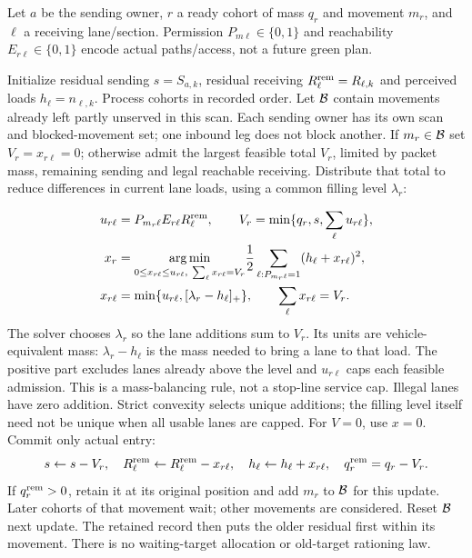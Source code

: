 \documentclass[10pt,a4paper]{article}
\newcommand{\pos}[1]{[#1]_+}
\begin{document}
Let $a$ be the sending owner, $r$ a ready cohort of mass $q_r$ and
movement $m_r$, and $\ell$ a receiving lane/section.
Permission $P_{m\ell}\in\{0,1\}$ and reachability
$E_{r\ell}\in\{0,1\}$ encode actual paths/access, not a future green plan.

Initialize residual sending $s=S_{a,k}$, residual receiving
$R^{\rm rem}_\ell=R_{\ell,k}$ and perceived loads $h_\ell=n_{\ell,k}$.
Process cohorts in recorded order. Let ${\cal B}$ contain movements
already left partly unserved in this scan. Each sending owner has its own
scan and blocked-movement set; one inbound leg does not block another.
If $m_r\in{\cal B}$ set $V_r=x_{r\ell}=0$; otherwise admit the largest
feasible total $V_r$, limited by packet mass, remaining sending and
legal reachable receiving. Distribute that total to reduce differences
in current lane loads, using a common filling level $\lambda_r$:

\begin{align}
 u_{r\ell}&=P_{m_r\ell}E_{r\ell}R^{\rm rem}_\ell,\qquad
 V_r=\min\{q_r,s,\sum_\ell u_{r\ell}\},\nonumber\\
 x_r&=\underset{0\leq x_{r\ell}\leq u_{r\ell},\
                    \sum_\ell x_{r\ell}=V_r}{\arg\min}
          \frac12\sum_{\ell:P_{m_r\ell}=1}(h_\ell+x_{r\ell})^2,
 \nonumber\\
 x_{r\ell}&=\min\{u_{r\ell},\pos{\lambda_r-h_\ell}\},\qquad
                    \sum_\ell x_{r\ell}=V_r .
 \label{eq:allocation}
\end{align}
The solver chooses $\lambda_r$ so the lane additions sum to $V_r$.
Its units are vehicle-equivalent mass: $\lambda_r-h_\ell$ is the mass
needed to bring a lane to that load. The positive part excludes lanes
already above the level and $u_{r\ell}$ caps each feasible admission.
This is a mass-balancing rule, not a stop-line service cap. Illegal lanes
have zero addition. Strict convexity selects unique additions; the filling
level itself need not be unique when all usable lanes are capped.
For $V=0$, use $x=0$. Commit only actual entry:
\begin{equation}
 s\leftarrow s-V_r,\quad
 R^{\rm rem}_\ell\leftarrow R^{\rm rem}_\ell-x_{r\ell},\quad
 h_\ell\leftarrow h_\ell+x_{r\ell},\quad
 q_r^{\rm rem}=q_r-V_r .
 \label{eq:allocation-update}
\end{equation}
If $q_r^{\rm rem}>0$, retain it at its original position and add $m_r$
to ${\cal B}$ for this update. Later cohorts of that movement wait;
other movements are considered. Reset ${\cal B}$ next update.
The retained record then puts the older residual first within its
movement. There is no waiting-target allocation or old-target rationing law.
\end{document}
